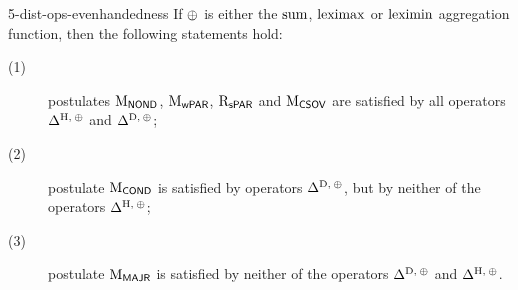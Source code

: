 \begin{prp}{}{5-dist-ops-evenhandedness}
	If $\agg$ is either the $\ssum$, $\leximax$ or $\leximin$
	aggregation function, then the following statements hold:
	\begin{description}
		\item[(1)] postulates $\ppm{\NOND}$, $\ppm{\WPRT}$, $\ppr{\SPRT}$ and $\ppm{\CSOV}$
		are satisfied by all operators $\me^{\hamming,\:\agg}$ and $\me^{\drastic,\:\agg}$;
		\item[(2)] postulate $\ppm{\COND}$ is satisfied by operators $\me^{\drastic,\:\agg}$,
			but by neither of the operators $\me^{\hamming,\:\agg}$;
		\item[(3)] postulate $\ppm{\MAJR}$ is satisfied by neither of the operators $\me^{\drastic,\:\agg}$
			and $\me^{\hamming,\:\agg}$.
	\end{description}
\end{prp}
